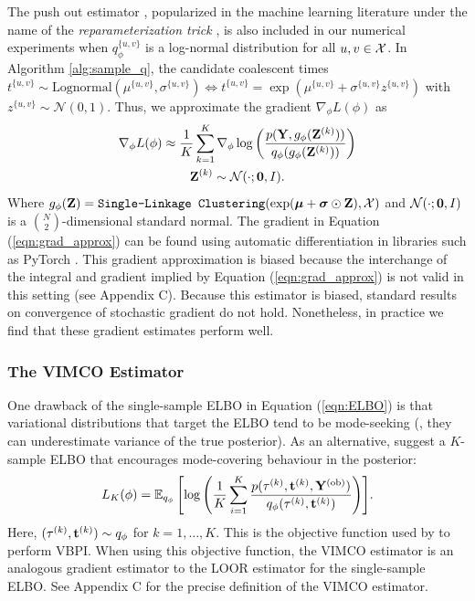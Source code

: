 The push out estimator \citep{rubinstein_sensitivity_1992}, popularized in the machine learning literature under the name of the  \textit{reparameterization trick} \citep{Kingma:2014}, is also included in our numerical experiments when $q_\phi^{\{u,v\}}$ is a log-normal distribution for all $u,v \in \mathcal{X}$. In Algorithm \ref{alg:sample_q}, the candidate coalescent times $t^{\{u,v\}} \sim \text{Lognormal}(\mu^{\{u,v\}},\sigma^{\{u,v\}}) \iff t^{\{u,v\}} = \exp(\mu^{\{u,v\}} + \sigma^{\{u,v\}} z^{\{u,v\}})$ with $z^{\{u,v\}} \sim \mathcal{N}(0,1)$. Thus, we approximate the gradient $\nabla_{\phi} L(\phi)$ as
%
\begin{gather}
    \nabla_\phi L(\phi) \approx \frac{1}{K} \sum_{k=1}^K \nabla_{\phi} \log\left(\frac{p(\mathbf{Y}, g_{\phi}(\mathbf{Z}^{(k)}))}{q_\phi(g_{\phi}(\mathbf{Z}^{(k)}))}\right) \label{eqn:grad_approx}\\
    \mathbf{Z}^{(k)} \sim \mathcal{N}(\cdot;\mathbf{0},I).
\end{gather}
%
Where $g_{\phi}(\mathbf{Z}) = \texttt{Single-Linkage Clustering}(\exp(\boldsymbol{\mu} + \boldsymbol{\sigma} \odot \mathbf{Z}),\mathcal{X})$ and $\mathcal{N}(\cdot;\mathbf{0},I)$ is a $\binom{N}{2}$-dimensional standard normal. The gradient in Equation (\ref{eqn:grad_approx}) can be found using automatic differentiation in libraries such as PyTorch \citep{Paszke:2019}. This gradient approximation is biased because the interchange of the integral and gradient implied by Equation (\ref{eqn:grad_approx}) is not valid in this setting (see Appendix C). Because this estimator is biased, standard results on convergence of stochastic gradient do not hold. Nonetheless, in practice we find that these gradient estimates perform well.

\subsubsection{The VIMCO Estimator}

One drawback of the single-sample ELBO in Equation (\ref{eqn:ELBO}) is that variational distributions that target the ELBO tend to be mode-seeking (\ie, they can underestimate variance of the true posterior). As an alternative, \citet{Mnih:2016} suggest a $K$-sample ELBO that encourages mode-covering behaviour in the posterior:
%
\begin{equation}
     L_K(\phi) = \mathbb{E}_{q_{\phi}}\left[\log\left(\frac{1}{K} \sum_{i=1}^K\frac{p(\tau^{(k)},\mathbf{t}^{(k)},\mathbf{Y}^{{(\text{ob})}})}{q_\phi(\tau^{(k)},\mathbf{t}^{(k)})}\right)\right]\!.
    \label{eqn:ELBO_K} 
\end{equation}
%
Here, $(\tau^{(k)},\mathbf{t}^{(k)}) \sim q_{\phi}$ for $k = 1,\ldots,K$. This is the objective function used by \citet{Zhang:2024} to perform VBPI. When using this objective function, the VIMCO estimator is an analogous gradient estimator to the LOOR estimator for the single-sample ELBO. See Appendix C for the precise definition of the VIMCO estimator.
